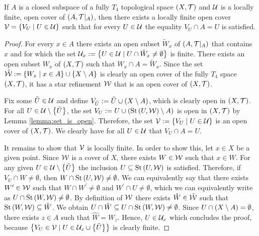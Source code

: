 \begin{lemma}
	If $A$ is a closed subspace of a fully $T_4$ topological space $\tspace$ and $\cover$ is a locally finite, open cover of $\reltspace$, then there exists a locally finite open cover $\cover[V] = \Bbraces{V_U \mid U \in \cover}$ such that for every $U \in \cover$ the equality $V_U \cap A = U$ is satisfied. 
\end{lemma}
\begin{proof}
	For every $x \in A$ there exists an open subset $\tilde{W}_x$ of $\reltspace$ that contains $x$ and for which the set $\cover_x := \Bbraces{U \in \cover \mid U \cap \tilde{W}_x \neq \emptyset}$ is finite. There exists an open subset $W_x$ of $\tspace$ such that $W_x \cap A = \tilde{W}_x$. Since the set $\hat{\cover[W]} := \Bbraces{W_x \mid x \in A} \cup \Bbraces{X \setminus A}$ is clearly an open cover of the fully $T_4$ space $\tspace$, it has a star refinement $\cover[W]$ that is an open cover of $\tspace$. 
	
	Fix some $\tilde{U} \in \cover$ and define $V_{\tilde{U}} := \tilde{U} \cup \pbraces{X \setminus A}$, which is clearly open in $\tspace$. For all $U \in \cover\setminus \Bbraces{\tilde{U}}$, the set $V_U := U \cup \pbraces{\St \pbraces{U, \cover[W]} \setminus A}$ is open in $\tspace$ by Lemma \ref{lemma:set_is_open}. Therefore, the set $\cover[V] := \Bbraces{V_U \mid U \in \cover}$ is an open cover of $\tspace$. We clearly have for all $U \in \cover$ that $V_U \cap A = U$. 
	
	It remains to show that $\cover[V]$ is locally finite. In order to show this, let $x \in X$ be a given point. Since $\cover[W]$ is a cover of $X$, there exists $W \in \cover[W]$ such that $x \in W$. For any given $U \in \cover \setminus \Bbraces{\tilde{U}}$ the inclusion $U \subseteq \St\pbraces{U, \cover[W]}$ is satisfied. Therefore, if $V_U \cap W \neq \emptyset$, then $W \cap \St\pbraces{U, \cover[W]} \neq \emptyset$. We can equivalently say that there exists $W^\prime \in \cover[W]$ such that $W \cap W^\prime \neq \emptyset$ and $W^\prime \cap U \neq \emptyset$, which we can equivalently write as $U \cap \St\pbraces{W, \cover[W]} \neq \emptyset$. By definition of $\cover[W]$ there exists $\hat{W} \in \hat{\cover[W]}$ such that $\St\pbraces{W, \cover[W]} \subseteq \hat{W}$. We obtain $U \cap \hat{W} \subseteq U \cap \St\pbraces{W, \cover[W]} \neq \emptyset$. Since $U \cap \pbraces{X \setminus A} = \emptyset$, there exists $z \in A$ such that $\hat{W} = W_z$. Hence, $U \in \cover_z$ which concludes the proof, because $\Bbraces{V_U \in \cover[V] \mid U \in \cover_z \cup \Bbraces{\tilde{U}}}$ is clearly finite.  
\end{proof}




